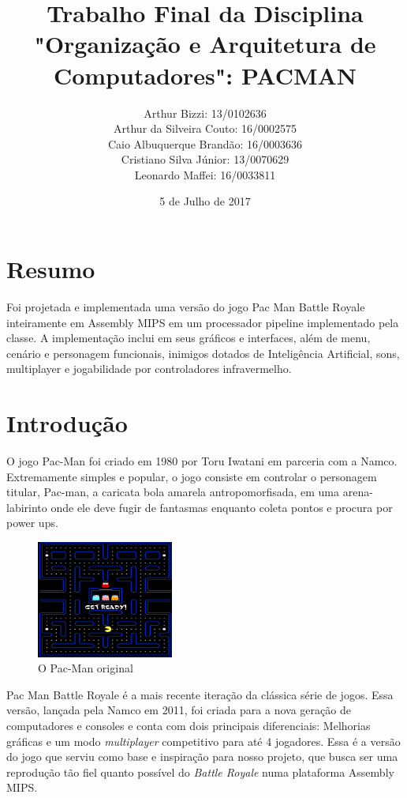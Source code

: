 \documentclass[12pt, a4paper, twocolumn]{article}
\begin{document}
\title{Trabalho Final da Disciplina "Organização e Arquitetura de Computadores": PACMAN}
\author{
Arthur Bizzi: 13/0102636 \\
Arthur da Silveira Couto: 16/0002575 \\
Caio Albuquerque Brandão: 16/0003636 \\
Cristiano Silva Júnior: 13/0070629 \\
Leonardo Maffei: 16/0033811 \\}
\date{5 de Julho de 2017}
\maketitle

\section{Resumo}
Foi projetada e implementada uma versão do jogo Pac Man Battle Royale inteiramente em Assembly MIPS em um processador pipeline implementado pela classe. A implementação inclui em seus gráficos e interfaces, além de menu, cenário e personagem funcionais, inimigos dotados de Inteligência Artificial, sons, multiplayer e jogabilidade por controladores infravermelho.

\section{Introdução}
 O jogo Pac-Man foi criado em 1980 por Toru Iwatani em parceria com a Namco. Extremamente simples e popular, o jogo consiste em controlar o personagem titular, Pac-man, a caricata bola amarela antropomorfisada, em uma arena-labirinto onde ele deve fugir de fantasmas enquanto coleta pontos e procura por power ups.

 \begin{figure}[h!]
    \centering
    \includegraphics[width=0.4\textwidth]{pakku.png}
    \caption{O Pac-Man original}
\end{figure}

Pac Man Battle Royale é a mais recente iteração da clássica série de jogos. Essa versão, lançada pela Namco em 2011, foi criada para a nova geração de computadores e consoles e conta com dois principais diferenciais: Melhorias gráficas e um modo \textit{multiplayer} competitivo para até 4 jogadores. Essa é a versão do jogo que serviu como base e inspiração para nosso projeto, que busca ser uma reprodução tão fiel quanto possível do \textit{Battle Royale} numa plataforma Assembly MIPS.
\end{document}
